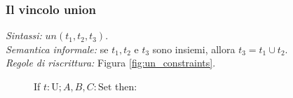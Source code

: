\documentclass[12pt,a4paper,openright]{book} %
\begin{document}
\subsubsection{Il vincolo union}

\textit{Sintassi:} $un(t_1, t_2, t_3)$.\\
\noindent\textit{Semantica informale:} se $t_1, t_2$ e $t_3$ sono insiemi,  allora $t_3 = t_1 \cup t_2$.\\
\noindent\textit{Regole di riscrittura:} Figura \ref{fig:un_constraints}.

\begin{figure}
	\begin{tcolorbox}[colframe=black, colback=white, sharp corners]
		\setcounter{equation}{0}
		\renewcommand{\theequation}{$\cup$\textsubscript{\arabic{equation}}}

		If $t: \text{U}; A, B, C: \text{Set}$ then:


\end{tcolorbox}
\end{figure}
\end{document}
